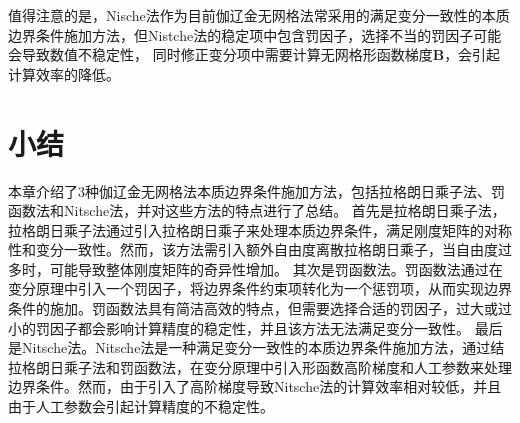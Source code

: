 值得注意的是，Nische法作为目前伽辽金无网格法常采用的满足变分一致性的本质边界条件施加方法，但Nistche法的稳定项中包含罚因子，选择不当的罚因子可能会导致数值不稳定性，
同时修正变分项中需要计算无网格形函数梯度$\pmb{B}$，会引起计算效率的降低。
\section{小结}
本章介绍了3种伽辽金无网格法本质边界条件施加方法，包括拉格朗日乘子法、罚函数法和Nitsche法，并对这些方法的特点进行了总结。
首先是拉格朗日乘子法，拉格朗日乘子法通过引入拉格朗日乘子来处理本质边界条件，满足刚度矩阵的对称性和变分一致性。然而，该方法需引入额外自由度离散拉格朗日乘子，当自由度过多时，可能导致整体刚度矩阵的奇异性增加。
其次是罚函数法。罚函数法通过在变分原理中引入一个罚因子，将边界条件约束项转化为一个惩罚项，从而实现边界条件的施加。罚函数法具有简洁高效的特点，但需要选择合适的罚因子，过大或过小的罚因子都会影响计算精度的稳定性，并且该方法无法满足变分一致性。
最后是Nitsche法。Nitsche法是一种满足变分一致性的本质边界条件施加方法，通过结拉格朗日乘子法和罚函数法，在变分原理中引入形函数高阶梯度和人工参数来处理边界条件。然而，由于引入了高阶梯度导致Nitsche法的计算效率相对较低，并且由于人工参数会引起计算精度的不稳定性。




